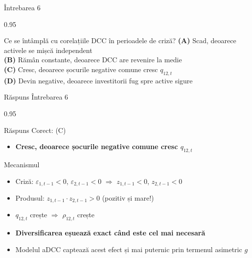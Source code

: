 \documentclass[9pt, aspectratio=169, t]{beamer}
\begin{document}
\begin{frame}{Întrebarea 6}
    \begin{cminipage}{0.95\textwidth}
    \begin{block}{Ce se întâmplă cu corelațiile DCC în perioadele de criză?}
        \textcolor{MainBlue}{\textbf{(A)}} Scad, deoarece activele se mișcă independent\\[3pt]
        \textcolor{MainBlue}{\textbf{(B)}} Rămân constante, deoarece DCC are revenire la medie\\[3pt]
        \textcolor{MainBlue}{\textbf{(C)}} Cresc, deoarece șocurile negative comune cresc $q_{12,t}$\\[3pt]
        \textcolor{MainBlue}{\textbf{(D)}} Devin negative, deoarece investitorii fug spre active sigure
    \end{block}
    \end{cminipage}
\end{frame}

\begin{frame}{Răspuns Întrebarea 6}
    \begin{cminipage}{0.95\textwidth}
    \begin{exampleblock}{Răspuns Corect: (C)}
        \begin{itemize}\setlength{\itemsep}{0pt}
            \item \textbf{Cresc, deoarece șocurile negative comune cresc $q_{12,t}$}
        \end{itemize}
    \end{exampleblock}

    \pause
    \begin{block}{Mecanismul}
        \begin{itemize}\setlength{\itemsep}{0pt}
            \item Criză: $\varepsilon_{1,t-1} < 0$, $\varepsilon_{2,t-1} < 0$ $\Rightarrow$ $z_{1,t-1} < 0$, $z_{2,t-1} < 0$
            \item Produsul: $z_{1,t-1} \cdot z_{2,t-1} > 0$ (pozitiv și mare!)
            \item $q_{12,t}$ crește $\Rightarrow$ $\rho_{12,t}$ crește
            \item \textbf{Diversificarea eșuează exact când este cel mai necesară}
            \item Modelul aDCC captează acest efect și mai puternic prin termenul asimetric $g$
        \end{itemize}
    \end{block}
    \end{cminipage}
\end{frame}
\end{document}

